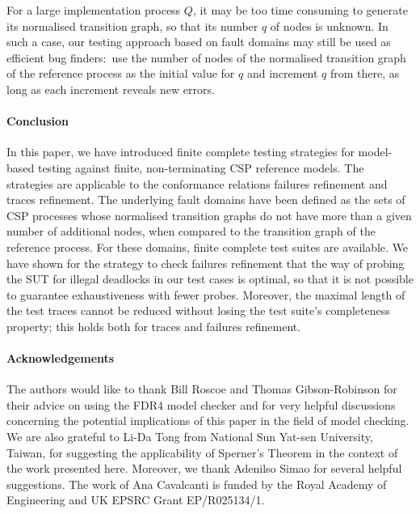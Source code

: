 \documentclass[3p,times]{elsarticle}
\begin{document}
For a large implementation process $Q$, it may be too time consuming to
generate its normalised transition graph, so that its number $q$ of nodes is
unknown. In such a case, our testing approach based on fault domains may
still be used as efficient bug finders:~use the number of nodes of the
normalised transition graph of the reference process as the initial value for
$q$ and increment $q$ from there, as long as each increment reveals new
errors.

\paragraph{Conclusion}
In this paper, we have introduced finite complete testing strategies for
model-based testing against finite, non-terminating CSP reference models. The
strategies are applicable to the conformance relations failures refinement
and traces refinement. The underlying fault domains have been defined as the
sets of CSP processes whose normalised transition graphs do not have more
than a given number of additional nodes, when compared to the transition
graph of the reference process. For these domains, finite complete test
suites are available. We have shown for the strategy to check failures
refinement that the way of probing the SUT for illegal deadlocks in our test
cases is optimal, so that it is not possible to guarantee exhaustiveness with
fewer probes. Moreover, the maximal length of the test traces cannot be
reduced without losing the test suite's completeness property; this holds
both for traces and failures refinement.


\paragraph{Acknowledgements}
The authors would like to thank Bill Roscoe and Thomas Gibson-Robinson for
their advice on using the FDR4 model checker and for very helpful discussions
concerning the potential implications of this paper in the field of model
checking. We are also grateful to Li-Da Tong from National Sun Yat-sen
University, Taiwan, for suggesting the applicability of Sperner's Theorem in
the context of the work presented here. Moreover, we thank Adenilso Simao for
several helpful suggestions. The work of Ana Cavalcanti is funded by the
Royal Academy of Engineering and UK EPSRC Grant EP/R025134/1.
\end{document}
